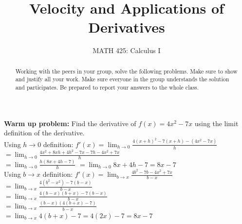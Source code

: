 \documentclass{ximera}
\title{Velocity and Applications of Derivatives}
\author{MATH 425: Calculus I}
\begin{document}
\begin{abstract}
   Working with the peers in your group, solve the following problems. Make sure to show and justify all your work. Make sure everyone in the group understands the solution and participates. Be prepared to report your answers to the whole class. 
\end{abstract}
\maketitle

\begin{exercise}
    \textbf{Warm up problem:} Find the derivative of $f(x)=4x^2-7x$ using the limit definition of the derivative.\\
        Using $h\rightarrow 0$ definition: $f'(x)=\lim_{h\rightarrow 0}\frac{4(x+h)^2-7(x+h)-(4x^2-7x)}{h}$\\
    $=\lim_{h\rightarrow 0} \frac{4x^2+8xh+4h^2-7x-7h-4x^2+7x}{h}$\\
    $=\lim_{h\rightarrow 0}\frac{h(8x+4h-7)}{h}$
    $=\lim_{h\rightarrow 0} 8x+4h-7=8x-7$\\
    
    Using $b\rightarrow x$ definition: $f'(x)=\lim_{b\rightarrow x}\frac{4b^2-7b-4x^2+7x}{b-x}$\\
    $=\lim_{b\rightarrow x} \frac{4(b^2-x^2)-7(b-x)}{b-x}$\\
    $=\lim_{b\rightarrow x} \frac{4(b-x)(b+x)-7(b-x)}{b-x}$\\
    $=\lim_{b\rightarrow x} \frac{(b-x)(4(b+x)-7)}{b-x}$\\
    $=\lim_{b\rightarrow x} 4(b+x)-7=4(2x)-7=8x-7$%
\end{exercise}
\end{document}
